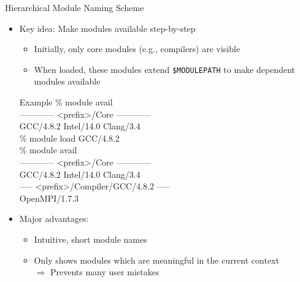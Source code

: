 \documentclass[10pt,xcolor={usenames,dvipsnames}]{beamer}
\begin{document}
\begin{frame}{Hierarchical Module Naming Scheme}
\begin{itemize}
    \item
        Key idea: Make modules available step-by-step
        \begin{itemize}
            \item
                Initially, only core modules (e.g., compilers) are visible
            \item
                When loaded, these modules extend \texttt{\$MODULEPATH} to make
                dependent modules available
        \end{itemize}
        \enskip
        \begin{minipage}{0.9\textwidth}
            \begin{exampleblock}{Example}
                \ttfamily
                \% module avail\\
                ------------ <prefix>/Core ------------\\
                GCC/4.8.2 \quad Intel/14.0 \quad Clang/3.4\\
                \% module load GCC/4.8.2\\
                \% module avail\\
                ------------ <prefix>/Core ------------\\
                GCC/4.8.2 \quad Intel/14.0 \quad Clang/3.4\\
                ----- <prefix>/Compiler/GCC/4.8.2 -----\\
                OpenMPI/1.7.3
            \end{exampleblock}
        \end{minipage}
    \smallskip
    \item
        Major advantages:
        \begin{itemize}
            \item
                Intuitive, short module names
            \item
                Only shows modules which are meaningful in the current context\\
                $\Rightarrow$ Prevents many user mistakes
        \end{itemize}
\end{itemize}
\end{frame}

\end{document}
